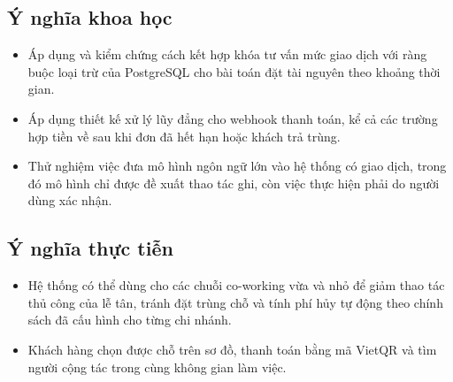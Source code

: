 \subsection{Ý nghĩa khoa học}
\begin{itemize}
    \item Áp dụng và kiểm chứng cách kết hợp khóa tư vấn mức giao dịch với ràng buộc loại trừ của PostgreSQL cho bài toán đặt tài nguyên theo khoảng thời gian.
    \item Áp dụng thiết kế xử lý lũy đẳng cho webhook thanh toán, kể cả các trường hợp tiền về sau khi đơn đã hết hạn hoặc khách trả trùng.
    \item Thử nghiệm việc đưa mô hình ngôn ngữ lớn vào hệ thống có giao dịch, trong đó mô hình chỉ được đề xuất thao tác ghi, còn việc thực hiện phải do người dùng xác nhận.
\end{itemize}

\subsection{Ý nghĩa thực tiễn}
\begin{itemize}
    \item Hệ thống có thể dùng cho các chuỗi co-working vừa và nhỏ để giảm thao tác thủ công của lễ tân, tránh đặt trùng chỗ và tính phí hủy tự động theo chính sách đã cấu hình cho từng chi nhánh.
    \item Khách hàng chọn được chỗ trên sơ đồ, thanh toán bằng mã VietQR và tìm người cộng tác trong cùng không gian làm việc.
\end{itemize}
